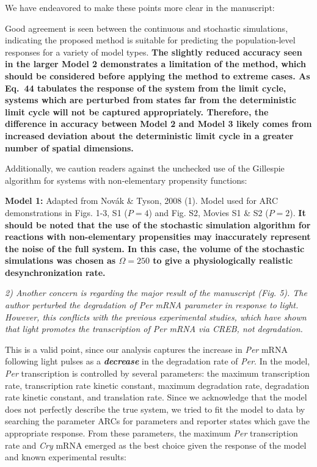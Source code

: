 \documentclass[11pt, letterpaper]{article}
\newenvironment{reviewer}{\itshape\color{gray}}{}
\newenvironment{manuscript}[1]{\begin{center}\begin{tcolorbox}[colback=green!5!white,colframe=green!75!black,width=0.8\textwidth,title={#1},breakable,fonttitle=\bfseries]}{\end{tcolorbox}\end{center}}
\begin{document}
We have endeavored to make these points more clear in the manuscript:

\begin{manuscript}{Supplemental Info, Page 6}
Good agreement is seen between the continuous and stochastic simulations, indicating the proposed method is suitable for predicting the population-level responses for a variety of model types.
{\bfseries The slightly reduced accuracy seen in the larger Model 2 demonstrates a limitation of the method, which should be considered before applying the method to extreme cases.
As Eq.~44 tabulates the response of the system from the limit cycle, systems which are perturbed from states far from the deterministic limit cycle will not be captured appropriately.
Therefore, the difference in accuracy between Model 2 and Model 3 likely comes from increased deviation about the deterministic limit cycle in a greater number of spatial dimensions.}
\end{manuscript}

Additionally, we caution readers against the unchecked use of the Gillespie algorithm for systems with non-elementary propensity functions:

\begin{manuscript}{Supplemental Info, Page 6}
{\bfseries Model 1:}
Adapted from Nov\'{a}k \& Tyson, 2008 (1). Model used for
ARC demonstrations in Figs. 1-3, S1 ($P=4$) and Fig. S2, Movies S1 \& S2
($P=2$).
{\bfseries It should be noted that the use of the stochastic simulation algorithm for reactions with non-elementary propensities may inaccurately represent the noise of the full system.
In this case, the volume of the stochastic simulations was chosen as $\Omega = 250$ to give a physiologically realistic desynchronization rate.}
\end{manuscript}

\begin{reviewer}
2) Another concern is regarding the major result of the manuscript (Fig. 5). The author perturbed the degradation of Per mRNA parameter in response to light. However, this conflicts with the previous experimental studies, which have shown that light promotes the transcription of Per mRNA via CREB, not degradation. 
\end{reviewer}

This is a valid point, since our analysis captures the increase in {\itshape Per} mRNA following light pulses as a {\itshape\bfseries decrease} in the degradation rate of {\itshape Per}.
In the model, {\itshape Per} transcription is controlled by several parameters: the maximum transcription rate, transcription rate kinetic constant, maximum degradation rate, degradation rate kinetic constant, and translation rate.
Since we acknowledge that the model does not perfectly describe the true system, we tried to fit the model to data by searching the parameter ARCs for parameters and reporter states which gave the appropriate response. 
From these parameters, the maximum {\itshape Per} transcription rate and {\itshape Cry} mRNA emerged as the best choice given the response of the model and known experimental results:
\end{document}
